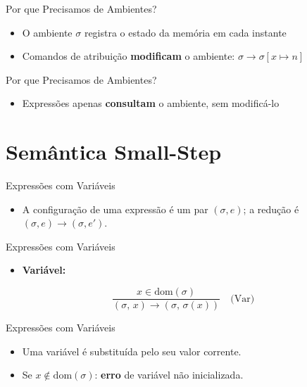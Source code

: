 \begin{frame}{Por que Precisamos de Ambientes?}

    \begin{itemize}

        \item
        O ambiente \(\sigma\) registra o estado da memória em cada instante
        \item
        Comandos de atribuição \textbf{modificam} o ambiente:
        \(\sigma \to \sigma[x \mapsto n]\)
    \end{itemize}
\end{frame}

\begin{frame}{Por que Precisamos de Ambientes?}

    \begin{itemize}

        \item
        Expressões apenas \textbf{consultam} o ambiente, sem modificá-lo
    \end{itemize}
\end{frame}


\section{Semântica Small-Step}\label{semuxe2ntica-small-step}

\begin{frame}{Expressões com Variáveis}

    \begin{itemize}

        \item
        A configuração de uma expressão é um par \((\sigma, e)\); a redução é
        \((\sigma, e) \to (\sigma, e')\).
    \end{itemize}
\end{frame}

\begin{frame}{Expressões com Variáveis}

    \begin{itemize}

        \item
        \textbf{Variável:}
    \end{itemize}

    \[\frac{x \in \mathrm{dom}(\sigma)}{(\sigma,\, x) \to (\sigma,\, \sigma(x))} \quad\text{(Var)}\]
\end{frame}

\begin{frame}{Expressões com Variáveis}

    \begin{itemize}

        \item
        Uma variável é substituída pelo seu valor corrente.
        \item
        Se \(x \notin \mathrm{dom}(\sigma)\): \textbf{erro} de variável não
        inicializada.
    \end{itemize}
\end{frame}

